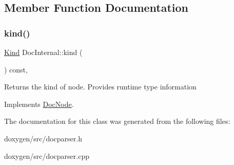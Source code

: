 \subsection{Member Function Documentation}
\mbox{\label{class_doc_internal_a1d493c47fa2ced4e56f8288c96939a99}} 
\subsubsection{\texorpdfstring{kind()}{kind()}}
{\footnotesize\ttfamily \mbox{\hyperlink{class_doc_node_aebd16e89ca590d84cbd40543ea5faadb}{Kind}} Doc\+Internal\+::kind (\begin{DoxyParamCaption}{ }\end{DoxyParamCaption}) const\hspace{0.3cm}{\ttfamily [inline]}, {\ttfamily [virtual]}}

Returns the kind of node. Provides runtime type information 

Implements \mbox{\hyperlink{class_doc_node_a108ffd214a72ba6e93dac084a8f58049}{Doc\+Node}}.



The documentation for this class was generated from the following files\+:\begin{DoxyCompactItemize}
\item 
doxygen/src/docparser.\+h\item 
doxygen/src/docparser.\+cpp\end{DoxyCompactItemize}
